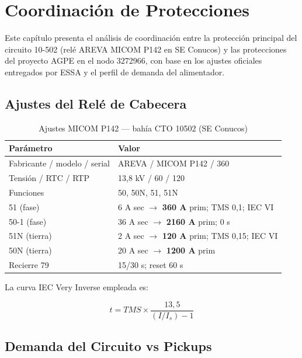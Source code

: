 \chapter{Coordinación de Protecciones}

Este capítulo presenta el análisis de coordinación entre la protección principal del circuito 10-502 (relé AREVA MICOM P142 en SE Conucos) y las protecciones del proyecto AGPE en el nodo 3272966, con base en los ajustes oficiales entregados por ESSA y el perfil de demanda del alimentador.

\section{Ajustes del Relé de Cabecera}

\begin{table}[H]
    \centering
    \caption{Ajustes MICOM P142 --- bahía CTO 10502 (SE Conucos)}
    \begin{tabular}{ll}
    \toprule
    \textbf{Parámetro} & \textbf{Valor} \\
    \midrule
    Fabricante / modelo / serial & AREVA / MICOM P142 / 360 \\
    Tensión / RTC / RTP & 13,8 kV / 60 / 120 \\
    Funciones & 50, 50N, 51, 51N \\
    51 (fase) & 6 A sec $\rightarrow$ \textbf{360 A} prim; TMS 0,1; IEC VI \\
    50-1 (fase) & 36 A sec $\rightarrow$ \textbf{2160 A} prim; 0 s \\
    51N (tierra) & 2 A sec $\rightarrow$ \textbf{120 A} prim; TMS 0,15; IEC VI \\
    50N (tierra) & 20 A sec $\rightarrow$ \textbf{1200 A} prim \\
    Recierre 79 & 15/30 s; reset 60 s \\
    \bottomrule
    \end{tabular}
\end{table}

La curva IEC Very Inverse empleada es:

\begin{equation}
t = TMS \times \frac{13{,}5}{(I/I_s) - 1}
\end{equation}

\section{Demanda del Circuito vs Pickups}

